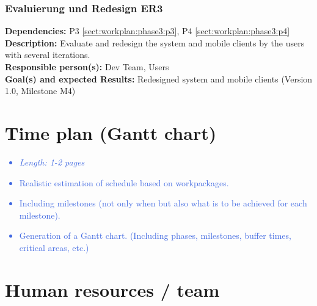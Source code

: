 \documentclass[a4paper,11pt]{article}
\providecommand*{\note}[1]{\small \textcolor{RoyalBlue}{\begin{minipage}{\textwidth}{#1}\end{minipage}}}
\begin{document}
\subsubsection{Evaluierung und Redesign ER3}
\label{sect:workplan:phase3:er3}
\textbf{Dependencies:} P3 \ref{sect:workplan:phase3:p3}, P4 \ref{sect:workplan:phase3:p4}\\
\textbf{Description:} Evaluate and redesign the system and mobile clients by the users with several iterations.\\
\textbf{Responsible person(s):} Dev Team, Users\\
\textbf{Goal(s) and expected Results:} Redesigned system and mobile clients (Version 1.0, Milestone M4)\\


\pagebreak
\section{Time plan (Gantt chart)}
\label{sect:timeplan}

\note{
\begin{itemize}
\item {\em Length: 1-2 pages}
\item Realistic estimation of schedule based on workpackages.
\item Including milestones (not only when but also what is to be achieved for each milestone).
\item Generation of a Gantt chart. (Including phases, milestones, buffer times, critical areas, etc.)
\end{itemize}
}

\section{Human resources / team}
\label{sect:team}
\end{document}
